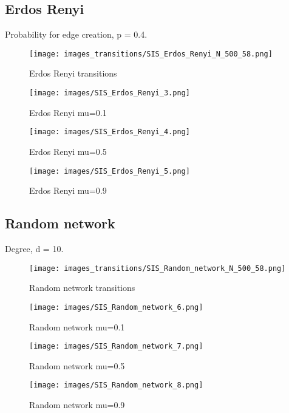 \documentclass[letterpaper]{article}
\begin{document}
\subsection{Erdos Renyi}
Probability for edge creation, p = 0.4.

\begin{figure}
  \centering
    \texttt{[image: images\_transitions/SIS\_Erdos\_Renyi\_N\_500\_58.png]}
  \caption{Erdos Renyi transitions}
  \label{fig:5}
\end{figure}

\begin{figure}
  \centering
    \texttt{[image: images/SIS\_Erdos\_Renyi\_3.png]}
  \caption{Erdos Renyi mu=0.1}
  \label{fig:6}
\end{figure}

\begin{figure}
  \centering
    \texttt{[image: images/SIS\_Erdos\_Renyi\_4.png]}
  \caption{Erdos Renyi mu=0.5}
  \label{fig:7}
\end{figure}

\begin{figure}
  \centering
    \texttt{[image: images/SIS\_Erdos\_Renyi\_5.png]}
  \caption{Erdos Renyi mu=0.9}
  \label{fig:8}
\end{figure}

\subsection{Random network}
Degree, d = 10.

\begin{figure}
  \centering
    \texttt{[image: images\_transitions/SIS\_Random\_network\_N\_500\_58.png]}
  \caption{Random network transitions}
  \label{fig:9}
\end{figure}

\begin{figure}
  \centering
    \texttt{[image: images/SIS\_Random\_network\_6.png]}
  \caption{Random network mu=0.1}
  \label{fig:10}
\end{figure}

\begin{figure}
  \centering
    \texttt{[image: images/SIS\_Random\_network\_7.png]}
  \caption{Random network mu=0.5}
  \label{fig:11}
\end{figure}

\begin{figure}
  \centering
    \texttt{[image: images/SIS\_Random\_network\_8.png]}
  \caption{Random network mu=0.9}
  \label{fig:12}
\end{figure}
\end{document}
